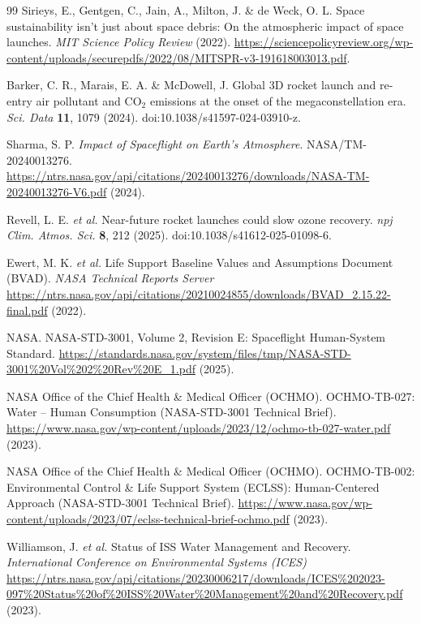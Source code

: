 \documentclass[12pt]{article}
\begin{document}
\begin{thebibliography}{99}
	Sirieys, E., Gentgen, C., Jain, A., Milton, J. \& de Weck, O. L.
	Space sustainability isn’t just about space debris: On the atmospheric impact of space launches.
	\textit{MIT Science Policy Review} (2022).
	\url{https://sciencepolicyreview.org/wp-content/uploads/securepdfs/2022/08/MITSPR-v3-191618003013.pdf}.
	
	Barker, C. R., Marais, E. A. \& McDowell, J.
	Global 3D rocket launch and re-entry air pollutant and CO$_2$ emissions at the onset of the megaconstellation era.
	\textit{Sci. Data} \textbf{11}, 1079 (2024).
	doi:10.1038/s41597-024-03910-z.
	
	Sharma, S. P.
	\textit{Impact of Spaceflight on Earth's Atmosphere}.
	NASA/TM-20240013276.
	\url{https://ntrs.nasa.gov/api/citations/20240013276/downloads/NASA-TM-20240013276-V6.pdf} (2024).
	
	Revell, L. E. \textit{et al.}
	Near-future rocket launches could slow ozone recovery.
	\textit{npj Clim. Atmos. Sci.} \textbf{8}, 212 (2025).
	doi:10.1038/s41612-025-01098-6.
	
	Ewert, M. K. \textit{et al.}
	Life Support Baseline Values and Assumptions Document (BVAD).
	\textit{NASA Technical Reports Server}
	\url{https://ntrs.nasa.gov/api/citations/20210024855/downloads/BVAD_2.15.22-final.pdf} (2022).
	
	NASA.
	NASA-STD-3001, Volume 2, Revision E: Spaceflight Human-System Standard.
	\url{https://standards.nasa.gov/system/files/tmp/NASA-STD-3001\%20Vol\%202\%20Rev\%20E_1.pdf} (2025).
	
	NASA Office of the Chief Health \& Medical Officer (OCHMO).
	OCHMO-TB-027: Water -- Human Consumption (NASA-STD-3001 Technical Brief).
	\url{https://www.nasa.gov/wp-content/uploads/2023/12/ochmo-tb-027-water.pdf} (2023).
	
	NASA Office of the Chief Health \& Medical Officer (OCHMO).
	OCHMO-TB-002: Environmental Control \& Life Support System (ECLSS): Human-Centered Approach (NASA-STD-3001 Technical Brief).
	\url{https://www.nasa.gov/wp-content/uploads/2023/07/eclss-technical-brief-ochmo.pdf} (2023).
	
	Williamson, J. \textit{et al.}
	Status of ISS Water Management and Recovery.
	\textit{International Conference on Environmental Systems (ICES)}
	\url{https://ntrs.nasa.gov/api/citations/20230006217/downloads/ICES\%202023-097\%20Status\%20of\%20ISS\%20Water\%20Management\%20and%20Recovery.pdf} (2023).
	

\end{thebibliography}
\end{document}
